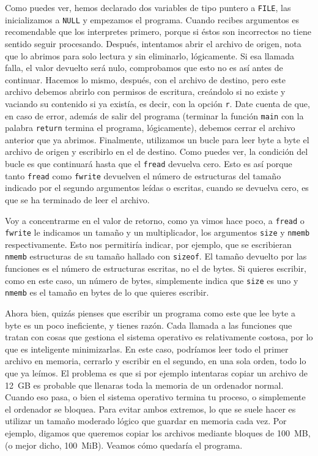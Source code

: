 \documentclass[a4paper]{article}
\begin{document}
Como puedes ver, hemos declarado dos variables de tipo puntero a \verb!FILE!,
las inicializamos a \verb!NULL! y empezamos el programa. Cuando recibes
argumentos es recomendable que los interpretes primero, porque si éstos son
incorrectos no tiene sentido seguir procesando. Después, intentamos abrir el
archivo de origen, nota que lo abrimos para solo lectura y sin eliminarlo,
lógicamente. Si esa llamada falla, el valor devuelto será nulo, comprobamos
que esto no es así antes de continuar. Hacemos lo mismo, después, con el
archivo de destino, pero este archivo debemos abrirlo con permisos de escritura,
creándolo si no existe y vaciando su contenido si ya existía, es decir, con la opción \verb!r!.
Date cuenta de que, en caso de error, además
de salir del programa (terminar la función \verb!main! con la palabra
\verb!return! termina el programa, lógicamente), debemos cerrar el archivo
anterior que ya abrimos. Finalmente, utilizamos un bucle para leer byte a byte
el archivo de origen y escribirlo en el de destino. Como puedes ver,
la condición del bucle es que continuará hasta que el \verb!fread! devuelva
cero. Esto es así porque tanto \verb!fread! como \verb!fwrite! devuelven
el número de estructuras del tamaño indicado por el segundo argumentos leídas o
escritas, cuando se devuelva cero, es que se ha terminado de leer el archivo.

Voy a concentrarme en el valor de retorno, como ya vimos hace poco, a
\verb!fread! o \verb!fwrite! le indicamos un tamaño y un multiplicador, los
argumentos \verb!size! y \verb!nmemb! respectivamente. Esto nos permitiría
indicar, por ejemplo, que se escribieran \verb!nmemb! estructuras de su tamaño
hallado con \verb!sizeof!. El tamaño devuelto por las funciones es el número
de estructuras escritas, no el de bytes. Si quieres escribir, como en este
caso, un número de bytes, simplemente indica que \verb!size! es uno y
\verb!nmemb! es el tamaño en bytes de lo que quieres escribir.

Ahora bien, quizás pienses que escribir un programa como este que lee byte a
byte es un poco ineficiente, y tienes razón. Cada llamada a las funciones
que tratan con cosas que gestiona el sistema operativo es relativamente
costosa, por lo que es inteligente minimizarlas. En este caso, podríamos leer
todo el primer archivo en memoria, cerrarlo y escribir en el segundo, en una
sola orden, todo lo que ya leímos. El problema es que si por ejemplo intentaras
copiar un archivo de 12~GB es probable que llenaras toda la memoria
de un ordenador normal. Cuando eso pasa, o bien el sistema operativo termina tu
proceso, o simplemente el ordenador se bloquea. Para evitar ambos extremos, lo
que se suele hacer es utilizar un tamaño moderado lógico que guardar en memoria
cada vez. Por ejemplo, digamos que queremos copiar los archivos mediante bloques
de 100~MB, (o mejor dicho, 100~MiB). Veamos cómo
quedaría el programa.
\end{document}
